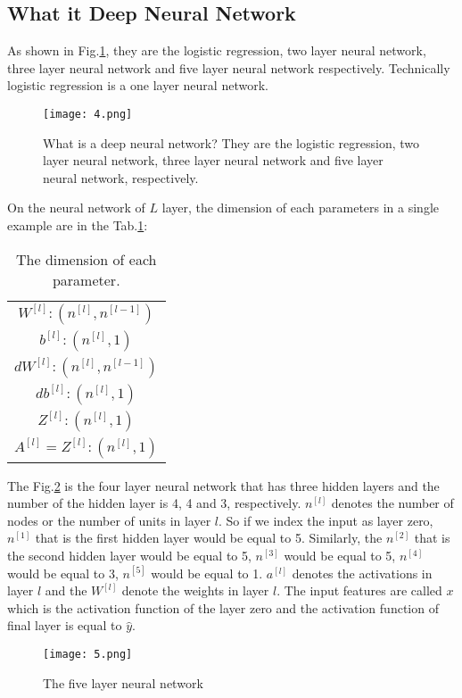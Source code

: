 \documentclass[a4paper]{article}
\begin{document}
\subsection{What it Deep Neural Network}
As shown in Fig.\ref{fig4}, they are the logistic regression, two layer neural network, three layer neural 
network and five layer neural network respectively. Technically logistic regression is a one layer neural network.
\begin{figure}[h]
	\centering
	\texttt{[image: 4.png]}
	\caption{What is a deep neural network? They are the logistic regression, two layer neural network, three layer neural network and five layer neural network, respectively.}
	\label{fig4}
\end{figure}
On the neural network of $L$ layer, the dimension of each parameters in a single example are in the Tab.\ref{tb2}:
\begin{table}[hb]
	\centering
    \caption{The dimension of each parameter.}
	\begin{tabular}{c}
		\hline
		$W^{\left[l\right]} : \left(n^{\left[l\right]},n^{\left[l-1\right]}\right)$ \\
		$b^{\left[l\right]} : \left(n^{\left[l\right]},1\right)$\\
		$dW^{\left[l\right]} : \left(n^{\left[l\right]},n^{\left[l-1\right]}\right)$ \\
		$db^{\left[l\right]} : \left(n^{\left[l\right]},1\right)$ \\
		$Z^{\left[l\right]} : \left(n^{\left[l\right]},1\right)$\\
		$A^{\left[l\right]} = Z^{\left[l\right]}:\left(n^{\left[l\right]},1\right)$ \\
		\hline
	\end{tabular}
	\label{tb2}
\end{table}
The Fig.\ref{fig5} is the four layer neural network that has
three hidden layers and the number of the hidden layer is 4, 4 and 3, respectively. $n^{\left[l\right]}$ denotes the 
number of nodes or the number of units in layer $l$. So if we index the input as layer zero, $n^{\left[1\right]}$ that
is the first hidden layer would be equal to 5. Similarly, the $n^{\left[2\right]}$ that is the second hidden layer would be equal to 5, $n^{\left[3\right]}$ would be equal to 5, $n^{\left[4\right]}$ would be equal to 3, $n^{\left[5\right]}$ would be equal to 1. $a^{\left[l\right]}$ denotes the activations in layer $l$ and the $W^{\left[l\right]}$ denote the weights in layer 
$l$. The input features are called $x$ which is the activation function of the layer zero and the activation function of final layer is equal to $\hat{y}$. 
\begin{figure}[h]
	\centering
	\texttt{[image: 5.png]}
	\caption{The five layer neural network}
	\label{fig5}
\end{figure}
\end{document}
